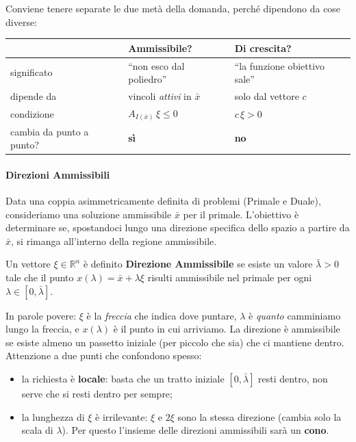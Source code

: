 \documentclass[12pt]{extarticle} %
\begin{document}
Conviene tenere separate le due metà della domanda, perché dipendono da cose diverse:
\begin{center}
\begin{tabular}{lll}
\hline
 & \textbf{Ammissibile?} & \textbf{Di crescita?} \\
\hline
significato & ``non esco dal poliedro'' & ``la funzione obiettivo sale'' \\
dipende da & vincoli \emph{attivi} in $\bar{x}$ & solo dal vettore $c$ \\
condizione & $A_{I(\bar{x})}\,\xi \le 0$ & $c\,\xi > 0$ \\
cambia da punto a punto? & \textbf{sì} & \textbf{no} \\
\hline
\end{tabular}
\end{center}

\paragraph{Direzioni Ammissibili}
Data una coppia asimmetricamente definita di problemi (Primale e Duale), consideriamo una soluzione ammissibile $\bar{x}$ per il primale. L'obiettivo è determinare se, spostandoci lungo una direzione specifica dello spazio a partire da $\bar{x}$, si rimanga all'interno della regione ammissibile.

Un vettore $\xi \in \mathbb{R}^n$ è definito \textbf{Direzione Ammissibile} se esiste un valore $\bar{\lambda} > 0$ tale che il punto $x(\lambda) = \bar{x} + \lambda \xi$ risulti ammissibile nel primale per ogni $\lambda \in [0, \bar{\lambda}]$.

\noindent In parole povere: $\xi$ è la \emph{freccia} che indica dove puntare, $\lambda$ è \emph{quanto} camminiamo lungo la freccia, e $x(\lambda)$ è il punto in cui arriviamo. La direzione è ammissibile se esiste almeno un passetto iniziale (per piccolo che sia) che ci mantiene dentro. Attenzione a due punti che confondono spesso:
\begin{itemize}
    \item la richiesta è \textbf{locale}: basta che un tratto iniziale $[0,\bar{\lambda}]$ resti dentro, non serve che si resti dentro per sempre;
    \item la lunghezza di $\xi$ è irrilevante: $\xi$ e $2\xi$ sono la stessa direzione (cambia solo la scala di $\lambda$). Per questo l'insieme delle direzioni ammissibili sarà un \textbf{cono}.
\end{itemize}
\end{document}
